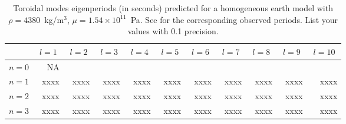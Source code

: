 \documentclass[11pt,titlepage,fleqn]{article}
\newcommand{\blank}{xxxx}
\begin{document}
\clearpage\pagebreak
\begin{table}
\centering
\caption[]
{{
Toroidal modes eigenperiods (in seconds) predicted for a homogeneous earth model with $\rho = 4380$~kg/m$^3$, $\mu = 1.54 \times 10^{11}$~Pa.
See  for the corresponding observed periods.
List your values with 0.1 precision.
\label{tab:mode_pred}
}}
\begin{tabular}{||r|r|r|r|r|r|r|r|r|r|r||}
\hline
      & $\;l=1\;$ & $\;l=2\;$ & $\;l=3\;$ & $\;l=4\;$ & $\;l=5\;$ & $\;l=6\;$ & $\;l=7\;$ & $\;l=8\;$ & $\;l=9\;$ & $\;l=10\;$ \\ \hline\hline
$n=0$ & NA &  &  &  &  &  &  &  &  &  \\  \hline
$n=1$ & \blank & \blank & \blank & \blank & \blank & \blank & \blank & \blank & \blank & \blank \\  \hline
$n=2$ & \blank & \blank & \blank & \blank & \blank & \blank & \blank & \blank & \blank & \blank \\  \hline
$n=3$ & \blank & \blank & \blank & \blank & \blank & \blank & \blank & \blank & \blank & \blank \\  \hline
\hline
\end{tabular}
\end{table}
\end{document}
